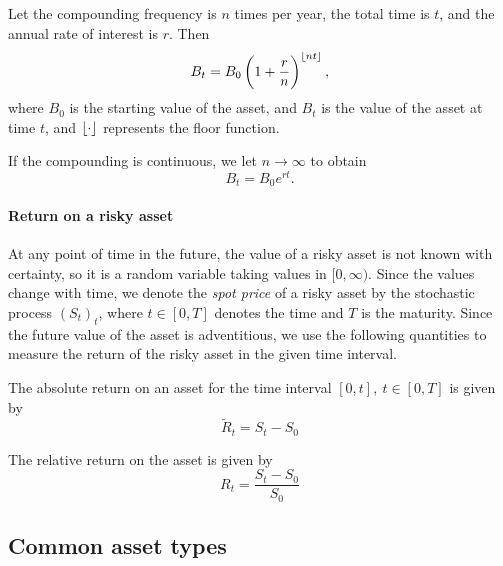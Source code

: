 Let the compounding frequency is $ n $ times per year, the total time is $ t $, and the annual rate of interest is $ r $. Then
\begin{equation}
	\label{eq:intro-compounding-discrete}
	B_t = B_0 \left(1 + \frac{r}{n} \right)^{\left\lfloor nt\right\rfloor},
\end{equation}
where $ B_0 $ is the starting value of the asset, and $ B_t $ is the value of the asset at time $ t $, and $ \left\lfloor\cdot\right\rfloor $ represents the floor function.

If the compounding is continuous, we let $ n \to \infty $ to obtain
\begin{equation}
	\label{eq:intro-compounding-continous}
	B_t = B_0 e^{rt}.
\end{equation}


\paragraph{Return on a risky asset}
At any point of time in the future, the value of a risky asset is not known with certainty, so it is a random variable taking values in $ [0, \infty) $. Since the values change with time, we denote the \emph{spot price} of a risky asset by the stochastic process $ (S_t)_t $, where $ t \in [0, T] $ denotes the time and $ T $ is the maturity. Since the future value of the asset is adventitious, we use the following quantities to measure the return of the risky asset in the given time interval.

\begin{dfn}
	The absolute return on an asset for the time interval $ [0, t], \  t \in [0, T] $ is given by
	\begin{equation*}
		\tilde{R}_t = S_t - S_0
	\end{equation*}
	
	The relative return on the asset is given by
	\begin{equation*}
		R_t = \frac{S_t - S_0}{S_0}
	\end{equation*}	
\end{dfn}



\subsection{Common asset types}


